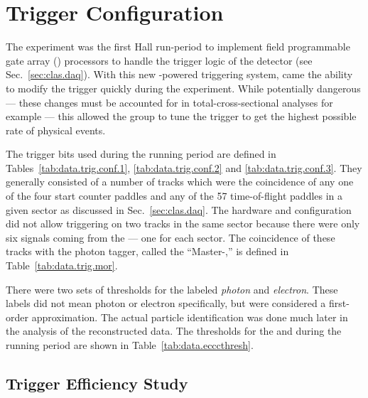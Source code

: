\section{\label{sec:data.trig}Trigger Configuration}

The  experiment was the first Hall  run-period to implement field programmable gate array () processors to handle the trigger logic of the  detector (see Sec.~\ref{sec:clas.daq}). With this new -powered triggering system, came the ability to modify the trigger quickly during the experiment. While potentially dangerous --- these changes must be accounted for in total-cross-sectional analyses for example --- this allowed the group to tune the trigger to get the highest possible rate of physical events.

The trigger bits used during the  running period are defined in Tables~\ref{tab:data.trig.conf.1}, \ref{tab:data.trig.conf.2} and \ref{tab:data.trig.conf.3}. They generally consisted of a number of tracks which were the coincidence of any one of the four start counter paddles and any of the 57 time-of-flight paddles in a given sector as discussed in Sec.~\ref{sec:clas.daq}. The hardware and configuration did not allow triggering on two tracks in the same sector because there were only six signals coming from the  --- one for each sector. The coincidence of these tracks with the photon tagger, called the ``Master-,'' is defined in Table~\ref{tab:data.trig.mor}.





There were two sets of thresholds for the  labeled \emph{photon} and \emph{electron}. These labels did not mean photon or electron specifically, but were considered a first-order approximation. The actual particle identification was done much later in the analysis of the reconstructed data. The thresholds for the  and  during the  running period are shown in Table~\ref{tab:data.ecccthresh}.


\subsection{\label{sec:data.trig.eff}Trigger Efficiency Study}

